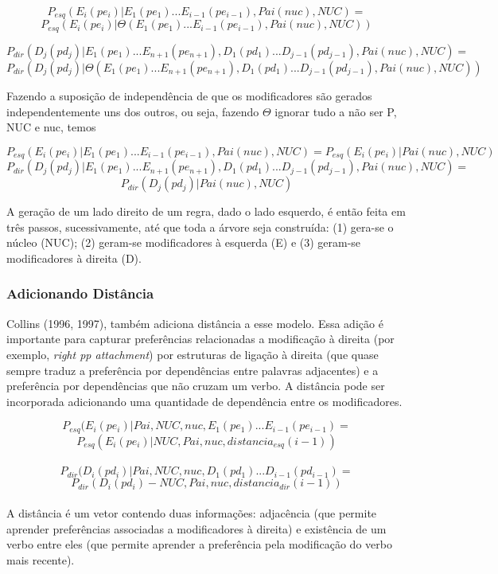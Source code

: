 $$P_{esq}(E_i(pe_i)|E_1(pe_1)...E_{i-1}(pe_{i-1}), Pai(nuc),NUC) = $$
$$P_{esq}(E_i(pe_i)|\Theta(E_1(pe_1)...E_{i-1}(pe_{i-1}), Pai(nuc),NUC))$$

$$P_{dir}(D_j(pd_j)|E_1(pe_1)...E_{n+1}(pe_{n+1}),D_1(pd_1)...D_{j-1}(pd_{j-1}), Pai(nuc),NUC) = $$
$$P_{dir}(D_j(pd_j)|\Theta(E_1(pe_1)...E_{n+1}(pe_{n+1}),D_1(pd_1)...D_{j-1}(pd_{j-1}), Pai(nuc),NUC))$$



Fazendo a suposição de independência de que os modificadores são gerados independentemente uns dos outros, ou seja, fazendo $\Theta$ ignorar tudo a não ser P, NUC e nuc, temos


$$P_{esq}(E_i(pe_i)|E_1(pe_1)...E_{i-1}(pe_{i-1}), Pai(nuc),NUC) = P_{esq}(E_i(pe_i)|Pai(nuc),NUC)$$
$$P_{dir}(D_j(pd_j)|E_1(pe_1)...E_{n+1}(pe_{n+1}),D_1(pd_1)...D_{j-1}(pd_{j-1}), Pai(nuc),NUC) =$$
$$P_{dir}(D_j(pd_j)|Pai(nuc),NUC)$$


A geração de um lado direito de um regra, dado o lado esquerdo, é então feita em
três passos, sucessivamente, até que toda a árvore seja construída: (1) gera-se o núcleo (NUC); (2) geram-se modificadores à esquerda (E) e (3) geram-se modificadores à direita (D).


\subsubsection{Adicionando Distância}
\label{sub:distancia}

Collins (1996, 1997), também adiciona distância a esse modelo. Essa adição é importante para capturar preferências relacionadas a modificação à direita (por exemplo, \emph{right pp attachment}) por estruturas de ligação à direita (que quase sempre traduz a preferência por dependências entre palavras adjacentes) e a preferência por dependências que não cruzam um verbo. A distância pode ser incorporada adicionando uma quantidade de dependência entre os modificadores.

$$P_{esq}(E_i(pe_i)|Pai,NUC, nuc,E_1(pe_1)...E_{i-1}(pe_{i - 1}) = $$
$$P_{esq}(E_i(pe_i)|NUC, Pai, nuc, distancia_{esq}(i - 1))$$
\\
$$P_{dir}(D_i(pd_i)|Pai,NUC, nuc,D_1(pd_1)...D_{i-1}(pd_{i - 1}) = $$
$$P_{dir}(D_i(pd_i)-NUC, Pai, nuc, distancia_{dir}(i - 1))$$
\\

A distância é um vetor contendo duas informações: adjacência (que permite aprender preferências associadas a modificadores à direita) e existência de um verbo entre eles (que permite aprender a preferência pela modificação do verbo mais recente).

